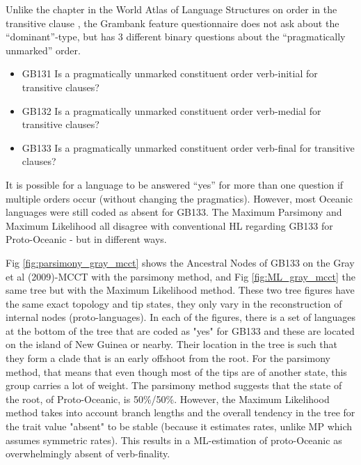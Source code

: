 \documentclass[12pt,letterpaper]{article}
\begin{document}
Unlike the chapter in the World Atlas of Language Structures on order in the transitive clause \citep{wals-81}, the Grambank feature questionnaire does not ask about the ``dominant''-type, but has 3 different binary questions about the ``pragmatically unmarked'' order. 

{\small
\begin{itemize}
    \item GB131 Is a pragmatically unmarked constituent order verb-initial for transitive clauses?
    \item GB132 Is a pragmatically unmarked constituent order verb-medial for transitive clauses?
    \item GB133 Is a pragmatically unmarked constituent order verb-final for transitive clauses?
\end{itemize}

 }
 
It is possible for a language to be answered ``yes'' for more than one question if multiple orders occur (without changing the pragmatics). However, most Oceanic languages were still coded as absent for GB133. The Maximum Parsimony and Maximum Likelihood all disagree with conventional HL regarding GB133 for Proto-Oceanic - but in different ways.

Fig \ref{fig:parsimony_gray_mcct} shows the Ancestral Nodes of GB133 on the Gray et al (2009)-MCCT with the parsimony method, and Fig \ref{fig:ML_gray_mcct} the same tree but with the Maximum Likelihood method. These two tree figures have the same exact topology and tip states, they only vary in the reconstruction of internal nodes (proto-languages). In each of the figures, there is a set of languages at the bottom of the tree that are coded as "yes" for  GB133 and these are located on the island of New Guinea or nearby. Their location in the tree is such that they form a clade that is an early offshoot from the root. For the parsimony method, that means that even though most of the tips are of another state, this group carries a lot of weight. The parsimony method suggests that the state of the root, of Proto-Oceanic, is 50\%/50\%. However, the Maximum Likelihood method takes into account branch lengths and the overall tendency in the tree for the trait value "absent" to be stable (because it estimates rates, unlike MP which assumes symmetric rates). This results in a ML-estimation of proto-Oceanic as overwhelmingly absent of verb-finality.
\end{document}
